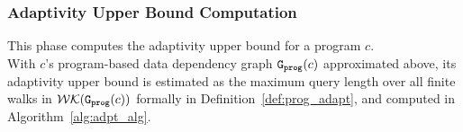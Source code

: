 \subsubsection{Adaptivity Upper Bound Computation}
\label{sec:static-adapt-comput}
This phase computes the adaptivity upper bound for a program $c$.
\\
With
$c$'s program-based data dependency graph $\mathtt{{G_{prog}}}({c})$ approximated above,
%
its adaptivity upper bound 
%
is estimated as
the maximum query length over all finite walks in $\mathcal{WK}(\mathtt{{G_{prog}}}({c}))$ formally in Definition~\ref{def:prog_adapt}, 
and computed 
in Algorithm~\ref{alg:adpt_alg}.
%
%

